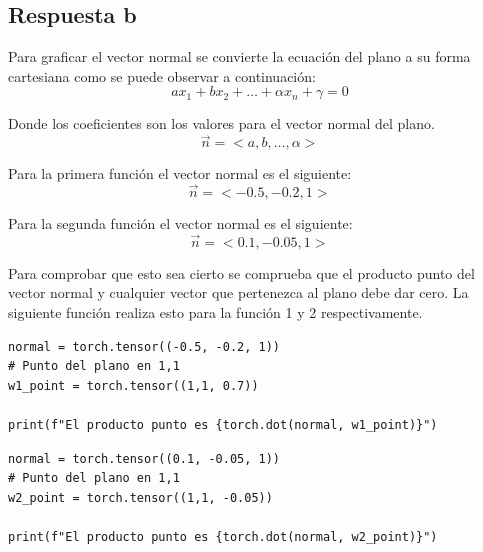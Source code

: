 \documentclass[12 pt]{article}
\begin{document}
\begin{enumerate}
\subsection{Respuesta b}
Para graficar el vector normal se convierte la ecuación del plano a su forma cartesiana como se puede observar a continuación:
\[
    ax_1 + bx_2 + \hdots + \alpha x_n + \gamma = 0
\]

Donde los coeficientes son los valores para el vector normal del plano.
\[
    \vec{n} = <a, b, \hdots, \alpha>
\]

Para la primera función el vector normal es el siguiente:
\[
    \vec{n} = <-0.5, -0.2, 1>
\]
 
Para la segunda función el vector normal es el siguiente:
\[
    \vec{n} = <0.1, -0.05, 1>
\]

Para comprobar que esto sea cierto se comprueba que el producto punto del vector normal y cualquier vector que pertenezca al plano debe dar cero. La siguiente función realiza esto para la función 1 y 2 respectivamente.

\begin{lstlisting}
normal = torch.tensor((-0.5, -0.2, 1))
# Punto del plano en 1,1
w1_point = torch.tensor((1,1, 0.7))

print(f"El producto punto es {torch.dot(normal, w1_point)}")
\end{lstlisting}

\begin{lstlisting}
normal = torch.tensor((0.1, -0.05, 1))
# Punto del plano en 1,1
w2_point = torch.tensor((1,1, -0.05))

print(f"El producto punto es {torch.dot(normal, w2_point)}")
\end{lstlisting}


\end{enumerate}
\end{document}
